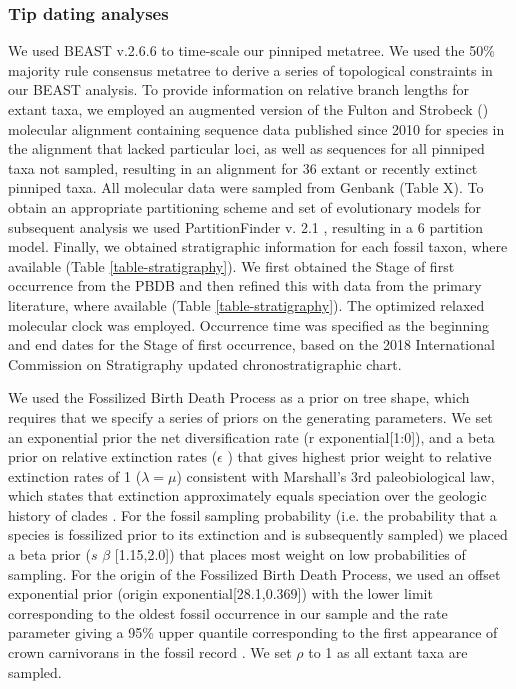 \documentclass[a4paper, 12pt]{article}
\begin{document}
\begin{landscape}
\subsubsection{Tip dating analyses} 

We used BEAST v.2.6.6 \citep{bouckaert2014beast} to time-scale our pinniped metatree. We used the 50\% majority rule consensus metatree to derive a series of topological constraints in our BEAST analysis. To provide information on relative branch lengths for extant taxa, we employed an augmented version of the Fulton and Strobeck (\citeyear{fulton2010multiple}) molecular alignment containing  sequence data published since 2010 for species in the alignment that lacked particular loci, as well as sequences for all pinniped taxa not sampled, resulting in an alignment for 36 extant or recently extinct pinniped taxa. All molecular data were sampled from Genbank (Table X). To obtain an appropriate partitioning scheme and set of evolutionary models for subsequent analysis we used PartitionFinder v. 2.1 \citep{lanfear2017partitionfinder}, resulting in a 6 partition model. Finally, we obtained stratigraphic information for each fossil taxon, where available (Table \ref{table-stratigraphy}). We first obtained the Stage of first occurrence from the PBDB and then refined this with data from the primary literature, where available (Table \ref{table-stratigraphy}). The optimized relaxed molecular clock was employed. Occurrence time was specified as the beginning and end dates for the Stage of first occurrence, based on the 2018 International Commission on Stratigraphy updated chronostratigraphic chart. 
 
We used the Fossilized Birth Death Process \citep{heath2014fossilized,gavryushkina2017bayesian} as a prior on tree shape, which requires that we specify a series of priors on the generating parameters. We set an exponential prior the net diversification rate (r \approx exponential[1:0]), and a beta prior on relative extinction rates ($\epsilon$ \approx [2, 1]) that gives highest prior weight to relative extinction rates of 1 ($\lambda = \mu$) consistent with Marshall's 3rd paleobiological law, which states that extinction approximately equals speciation over the geologic history of clades \citep{marshall2017five}. For the fossil sampling probability (i.e. the probability that a species is fossilized prior to its extinction and is subsequently sampled) we placed a beta prior ($s$ \approx $\beta$ [1.15,2.0]) that places most weight on low probabilities of sampling. For the origin of the Fossilized Birth Death Process, we used an offset exponential prior (origin \approx exponential[28.1,0.369]) with the lower limit corresponding to the oldest fossil occurrence in our sample and the rate parameter giving a 95\% upper quantile corresponding to the first appearance of crown carnivorans in the fossil record \citep{tomiya2021carnivorous}. We set $\rho$ to 1 as all extant taxa are sampled.


\end{landscape}
\end{document}

